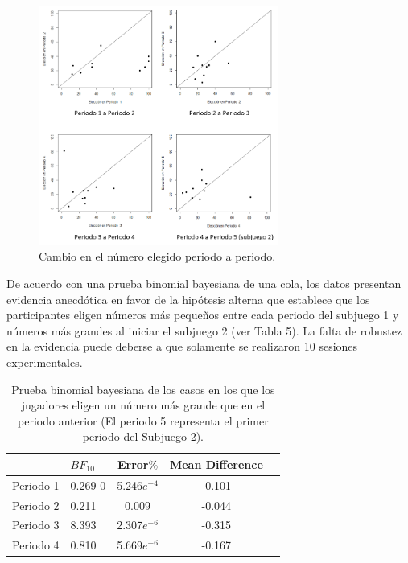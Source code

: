 \begin{figure}[th]
\centering
\includegraphics[width=0.70\textwidth]{Figures/Fig_5} 
\caption[Cambio en el número elegido periodo a periodo.]{Cambio en el número elegido periodo a periodo.}
\label{fig:Cambios_NumElegido}
\end{figure}

De acuerdo con una prueba binomial bayesiana de una cola, los datos presentan evidencia anecdótica en favor de la hipótesis alterna que establece que los participantes eligen números más pequeños entre cada periodo del subjuego 1 y números más grandes al iniciar el subjuego 2 (ver Tabla 5). La falta de robustez en la evidencia puede deberse a que solamente se realizaron 10 sesiones experimentales.

\begin{table}
\caption[Prueba Binomial para comprobar la proporción de casos en que ]{Prueba binomial bayesiana de los casos en los que los jugadores eligen un número más grande que en el periodo anterior (El periodo 5 representa el primer periodo del Subjuego 2).}
\label{DR_Sub1_NoP}
\centering
\begin{tabular}{l l | c c c}  %
\toprule
\textbf{} & \textbf{$BF_{10}$} & \textbf{Error$\%$} & \textbf{Mean Difference}\\
\midrule
Periodo 1 & 0.269 0& 5.246$e^{-4}$ & -0.101 \\
Periodo 2 & 0.211 & 0.009 & -0.044 \\
Periodo 3 & 8.393 & 2.307$e^{-6}$ & -0.315 \\
Periodo 4 & 0.810 & 5.669$e^{-6}$ & -0.167 \\
\bottomrule
\end{tabular}
\end{table}